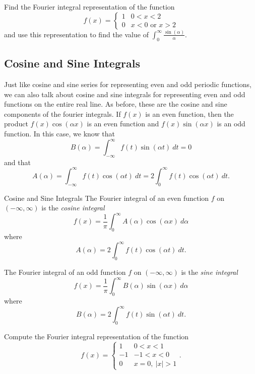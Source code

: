 \begin{exercise}
Find the Fourier integral representation of the function
\[ f(x) = \begin{cases}
1 & 0 < x < 2 \\
0 & x<0 \text{ or } x > 2
\end{cases}
\]
and use this representation to find the value of $\int_0^\infty \frac{\sin(\alpha)}{\alpha}$.
\end{exercise} 

\subsection{Cosine and Sine Integrals}

Just like cosine and sine series for representing even and odd periodic functions, we can also talk about cosine and sine integrals for representing even and odd functions on the entire real line. As before, these are the cosine and sine components of the fourier integrals. If $f(x)$ is an even function, then the product $f(x)\cos(\alpha x)$ is an even function and $f(x) \sin(\alpha x)$ is an odd function. In this case, we know that
\[ B(\alpha) =   \int_{-\infty}^\infty f(t) \sin\left(\alpha t\right)\ dt = 0 \] and that 
\[ A(\alpha) =  \int_{-\infty}^\infty f(t) \cos\left(\alpha t\right)\ dt = 2 \int_0^\infty f(t) \cos\left(\alpha t\right)\ dt. \]

\begin{theorem1}{Cosine and Sine Integrals}
The Fourier integral of an even function $f$ on $(-\infty, \infty)$ is the \emph{cosine integral}
\[ f(x) = \frac{1}{\pi} \int_0^\infty A(\alpha) \cos(\alpha x)\ d\alpha \] where
\[ A(\alpha) = 2\int_0^\infty f(t) \cos(\alpha t)\ dt. \]

The Fourier integral of an odd function $f$ on $(-\infty, \infty)$ is the \emph{sine integral}
\[ f(x) = \frac{1}{\pi} \int_0^\infty B(\alpha) \sin(\alpha x)\ d\alpha \] where
\[ B(\alpha) = 2\int_0^\infty f(t) \sin(\alpha t)\ dt. \]
\end{theorem1}

\begin{example}
Compute the Fourier integral representation of the function
\[ f(x) = \begin{cases}
1 & 0 < x < 1 \\
-1 & -1 < x < 0 \\
0 & x=0,\ |x| > 1
\end{cases}.\]
\end{example}

